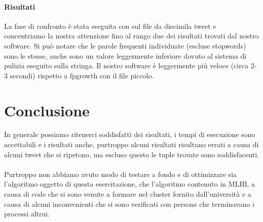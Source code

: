 \documentclass{article}
\begin{document}
\paragraph{Risultati} La fase di confronto è stata eseguita con sul file da diecimila tweet e concentriamo la nostra attenzione fino al rango due dei risultati trovati dal nostro software.
Si può notare che le parole frequenti individuate (escluse stopwords) sono le stesse, anche sono un valore leggermente inferiore dovuto al sistema di pulizia eseguito sulla stringa. 
Il nostro software è leggermente più veloce (circa 2-3 secondi) rispetto a fpgrowth con il file piccolo.

\section{Conclusione}
In generale possiamo ritenerci soddisfatti dei risultati, i tempi di esecuzione sono accettabili e i risultati anche, purtroppo alcuni risultati risultano errati a causa di alcuni tweet che si ripetono, ma escluso questo le tuple trovate sono soddisfacenti.\\\\
Purtroppo non abbiamo avuto modo di testare a fondo e di ottimizzare sia l'algoritmo oggetto di questa esercitazione, che l'algoritmo contenuto in MLIB, a causa di code che si sono venute a formare nel cluster fornito dall'università e a causa di alcuni inconvenienti che si sono verificati con persone che terminavano i processi altrui.
\end{document}
